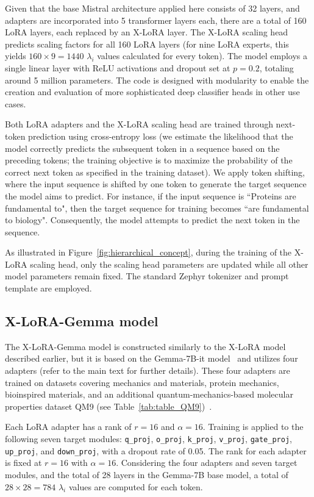Given that the base Mistral architecture applied here consists of 32 layers, and adapters are incorporated into 5 transformer layers each, there are a total of 160 LoRA layers, each replaced by an X-LoRA layer. The X-LoRA scaling head predicts scaling factors for all 160 LoRA layers (for nine LoRA experts, this yields $160 \times 9 = 1440$ $\lambda_i$ values calculated for every token). The model employs a single linear layer with ReLU activations and dropout set at $p=0.2$, totaling around 5 million parameters. The code is designed with modularity to enable the creation and evaluation of more sophisticated deep classifier heads in other use cases.

Both LoRA adapters and the X-LoRA scaling head are trained through next-token prediction using cross-entropy loss (we estimate the likelihood that the model correctly predicts the subsequent token in a sequence based on the preceding tokens; the training objective is to maximize the probability of the correct next token as specified in the training dataset). We apply token shifting, where the input sequence is shifted by one token to generate the target sequence the model aims to predict. For instance, if the input sequence is ``Proteins are fundamental to", then the target sequence for training becomes ``are fundamental to biology". Consequently, the model attempts to predict the next token in the sequence.

As illustrated in Figure~\ref{fig:hierarchical_concept}, during the training of the X-LoRA scaling head, only the scaling head parameters are updated while all other model parameters remain fixed. The standard Zephyr tokenizer and prompt template are employed.

\subsection{X-LoRA-Gemma model} The X-LoRA-Gemma model is constructed similarly to the X-LoRA model described earlier, but it is based on the Gemma-7B-it model~\cite{Google/gemma-7b-itFace} and utilizes four adapters (refer to the main text for further details). These four adapters are trained on datasets covering mechanics and materials, protein mechanics, bioinspired materials, and an additional quantum-mechanics-based molecular properties dataset QM9 (see Table~\ref{tab:table_QM9})~\cite{Ruddigkeit2012EnumerationGDB-17,Ramakrishnan2015ElectronicSpace}.

Each LoRA adapter has a rank of $r=16$ and $\alpha=16$. Training is applied to the following seven target modules: \texttt{q\_proj}, \texttt{o\_proj}, \texttt{k\_proj}, \texttt{v\_proj}, \texttt{gate\_proj}, \texttt{up\_proj}, and \texttt{down\_proj}, with a dropout rate of 0.05. The rank for each adapter is fixed at $r=16$ with $\alpha=16$. Considering the four adapters and seven target modules, and the total of 28 layers in the Gemma-7B base model, a total of $28 \times 28 = 784$ $\lambda_i$ values are computed for each token.

